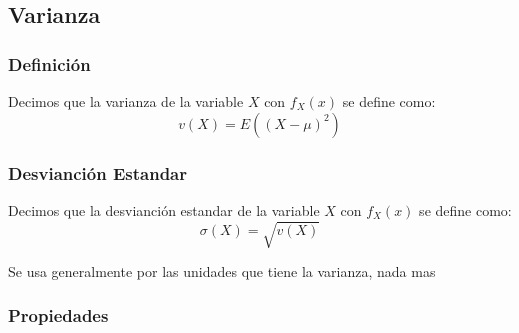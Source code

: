 \documentclass[12pt, fleqn]{report}                             %
\theoremstyle{break}                                            %
\begin{document}
            \clearpage
            \subsection{Varianza}

                \subsubsection{Definición}

                    Decimos que la varianza de la variable $X$
                    con $f_{X}(x)$ se define como:
                    \begin{equation*}
                        v(X) = E((X - \mu)^2)
                    \end{equation*}

   
                \vspace{1em}
                \subsubsection{Desvianción Estandar}

                    Decimos que la desvianción estandar de la variable $X$
                    con $f_{X}(x)$ se define como:
                    \begin{equation*}
                        \sigma(X) = \sqrt{v(X)}
                    \end{equation*}

                    Se usa generalmente por las unidades que tiene la varianza, nada mas


                \subsubsection{Propiedades}
\end{document}
